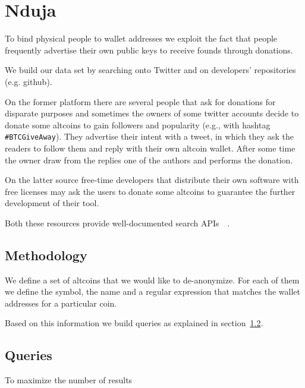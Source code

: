 \section{Nduja}
To bind physical people to wallet addresses we exploit the fact that
people frequently advertise their own public keys to receive founds
through  donations.

We build our data set by searching onto Twitter and on developers'
repositories (e.g. github).


On the former platform there are several people that ask for donations 
for disparate purposes and sometimes the owners of some twitter accounts
decide to donate some altcoins to gain followers and popularity (e.g., with hashtag \texttt{\#BTCGiveAway}). They advertise 
their intent with a tweet, in which they ask the readers to follow
them and reply with their own altcoin wallet. After some time the
owner draw from the replies one of the authors and performs the donation.

On the latter source free-time developers that distribute their
own software with free licenses may ask the users to donate some
altcoins to guarantee the further development of their tool. 

Both these resources provide well-documented search APIs~\cite{}~\cite{}.

\subsection{Methodology}
\label{sec:methodology}
We define a set of altcoins that we would like to de-anonymize. For each of them we define the symbol, the name and a regular expression
that matches the wallet addresses for a particular coin.

Based on this information we build queries as explained in section~\ref{sec:queries}.

\subsection{Queries} 
\label{sec:queries}

To maximize the number of results



